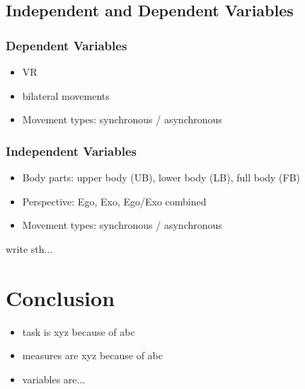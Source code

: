 \subsection{Independent and Dependent Variables}
\subsubsection{Dependent Variables}
\begin{itemize}
	\item VR
	\item bilateral movements
	\item Movement types: synchronous  / asynchronous 
\end{itemize}
\subsubsection{Independent Variables}
\begin{itemize}
	\item Body parts: upper body (UB), lower body (LB), full body (FB)
	\item Perspective: Ego, Exo, Ego/Exo combined
	\item Movement types: synchronous  / asynchronous 
\end{itemize}

write sth...

\section{Conclusion}
\begin{itemize}
	\item task is xyz because of abc
	\item measures are xyz because of abc
	\item variables are...
\end{itemize}
